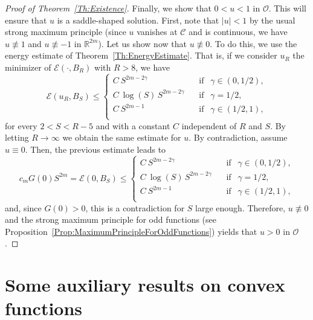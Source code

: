 \documentclass[12pt,reqno]{amsart}
\theoremstyle{definition}
\theoremstyle{remark}
\newcommand{\con}[1]{\mathbb{#1}}
\newcommand{\R}{\con{R}} %
\newcommand{\ccal}{\mathscr{C}}
\newcommand{\ecal}{\mathcal{E}}
\newcommand{\ocal}{\mathcal{O}}
\newcommand{\s}{\gamma}
\numberwithin{equation}{section}
\begin{document}
\begin{proof}[Proof of Theorem~\ref{Th:Existence}]
	Finally, we show that $0<u<1$ in $\ocal$. This will ensure that $u$ is a saddle-shaped solution. First, note that $|u| < 1$ by the usual strong maximum principle (since $u$ vanishes at $\ccal$ and is continuous, we have $u \not \equiv 1$  and $u\not\equiv -1$ in $\R^{2m}$). Let us show now that $u\not\equiv 0$. To do this, we use the energy estimate of Theorem~\ref{Th:EnergyEstimate}. That is, if we consider $u_R$ the minimizer of $\ecal(\cdot, B_R)$ with $R > 8$, we have
	$$
	\ecal (u_R,B_S) \leq \begin{cases}
	C \ S^{2m-2\s}\ \ \ \ &\textrm{if } \ \ \s\in(0,1/2),\\
	C\ \log(S)\,S^{2m-2\s}\ \ \ \ &\textrm{if } \ \ \s=1/2,\\
	C \ S^{2m-1}\ \ \ \ &\textrm{if } \ \ \s\in(1/2,1),\\
	\end{cases} $$
	for every $2 < S < R-5$ and with a constant $C$ independent of $R$ and $S$. By letting $R \to \infty$ we obtain the same estimate for $u$. By contradiction, assume $u\equiv 0$. Then, the previous estimate leads to
	$$
	c_m G(0)S^{2m} = \ecal(0, B_S) \leq \begin{cases}
	C \ S^{2m-2\s}\ \ \ \ &\textrm{if } \ \ \s\in(0,1/2),\\
	C\ \log(S)\,S^{2m-2\s}\ \ \ \ &\textrm{if } \ \ \s=1/2,\\
	C \ S^{2m-1}\ \ \ \ &\textrm{if } \ \ \s\in(1/2,1),\\
	\end{cases} $$
	and, since $G(0)>0$, this is a contradiction for $S$ large enough. Therefore, $u \not \equiv 0$ and the strong maximum principle for odd functions (see Proposition~\ref{Prop:MaximumPrincipleForOddFunctions}) yields that $u>0$ in $\ocal$. 
\end{proof}




\appendix


\section{Some auxiliary results on convex functions}
\label{Sec:AuxiliaryResults}
\end{document}
